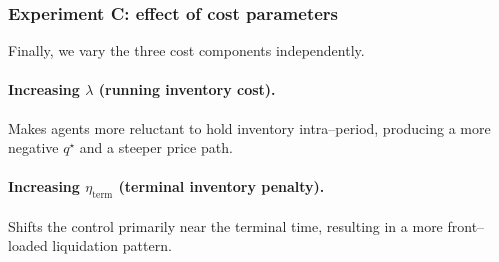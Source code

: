 \documentclass[11pt]{article}
\theoremstyle{definition}
\begin{document}


\subsubsection*{Experiment C: effect of cost parameters}

Finally, we vary the three cost components independently.

\paragraph*{Increasing $\lambda$ (running inventory cost).}
Makes agents more reluctant to hold inventory intra--period, producing a 
more negative $q^\star$ and a steeper price path.

\paragraph*{Increasing $\eta_{\mathrm{term}}$ (terminal inventory penalty).}
Shifts the control primarily near the terminal time, resulting in a 
more front--loaded liquidation pattern.
\end{document}
